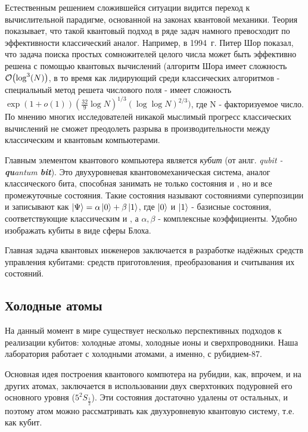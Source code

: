\documentclass[12pt]{article}
\begin{document}
    Естественным решением сложившейся ситуации видится переход к вычислительной
    парадигме, основанной на законах квантовой механики. Теория показывает, что
    такой квантовый подход в ряде задач намного превосходит по эффективности
    классический аналог. Например, в \mbox{1994 г.} Питер Шор показал, что задача поиска
    простых сомножителей целого числа может быть эффективно решена с помощью
    квантовых вычислений (алгоритм Шора имеет сложность $\order{\log[3](N)}$,
    в то время как лидирующий среди классических алгоритмов - специальный метод
    решета числового поля - имеет сложность
    $\exp{(1+o(1)) (\frac{32}{9}\log{N})^{1/3} (\log{\log{N}})^{2/3})}$,
    где N - факторизуемое число. По мнению многих исследователей никакой
    мыслимый прогресс классических вычислений не сможет преодолеть разрыва
    в производительности между классическим и квантовым компьютерами.

    Главным элементом квантового компьютера является \textit{кубит}
    (от анлг. \textit{qubit - \textbf{qu}antum \textbf{bit}}). Это двухуровневая
    квантовомеханическая система, аналог классического бита, способная занимать
    не только состояния  и , но и все промежуточные состояния.
    Такие состояния называют состояниями суперпозиции и записывают как
    $\ket{\Psi} = \alpha \ket{0} +\beta \ket{1}$, где $\ket{0}$ и $\ket{1}$ - базисные
    состояния, соответствующие классическим  и , а
    $\alpha,\beta$ - комплексные коэффициенты. Удобно изображать кубиты в виде
    сферы Блоха.

   

    Главная задача квантовых инженеров заключается в разработке
    надёжных средств управления кубитами: средств приготовления,
    преобразования и считывания их состояний. 


    \subsection{Холодные атомы}
    На данный момент в мире существует несколько перспективных подходов
    к реализации кубитов: холодные атомы, холодные ионы и сверхпроводники.
    Наша лаборатория работает с холодными атомами, а именно, с рубидием-87.

    Основная идея построения квантового компютера на рубидии, как, впрочем, и
    на других атомах, заключается в использовании двух сверхтонких подуровней
    его основного уровня ($5^2S_{\frac12}$). Эти состояния достаточно удалены
    от остальных, и поэтому атом можно рассматривать как двухуровневую
    квантовую систему, т.е. как кубит.
    
\end{document}
